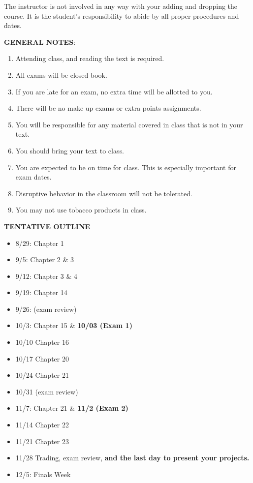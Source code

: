 \documentclass{article}
\begin{document}
The instructor is not involved in any way with your adding and dropping the course.  It is the student's responsibility to abide by all proper procedures and dates.  \\
\begin{center}
{\bf GENERAL NOTES}:
\end{center}
\begin{enumerate}
\item Attending class, and reading the text is required.
\item All exams will be closed book.
\item If you are late for an exam, no extra time will be allotted to you.
\item There will be no make up exams or extra points assignments.
\item You will be responsible for any material covered in class that is not in your text.
\item You should bring your text to class.
\item You are expected to be on time for class. This is especially important for exam
dates.
\item Disruptive behavior in the classroom will not be tolerated.
\item You may not use tobacco products in class.
\end{enumerate}
\begin{center}
\vspace*{5pt}
{\bf TENTATIVE OUTLINE}
\end{center}
\begin{itemize}
\item 8/29: Chapter 1
\item 9/5:  Chapter 2 \& 3
\item 9/12: Chapter 3 \& 4
\item 9/19: Chapter 14
\item 9/26: (exam review) 
\item 10/3: Chapter 15 \& {\bf 10/03 (Exam 1)}
\item 10/10 Chapter 16
\item 10/17 Chapter 20
\item 10/24 Chapter 21
\item 10/31 (exam review) 
\item 11/7: Chapter 21 \& {\bf 11/2 (Exam 2)}
\item 11/14 Chapter 22
\item 11/21 Chapter 23
\item 11/28 Trading, exam review, {\bf and the last day to present your projects.}
\item 12/5: Finals Week
\end{itemize}
\end{document}
